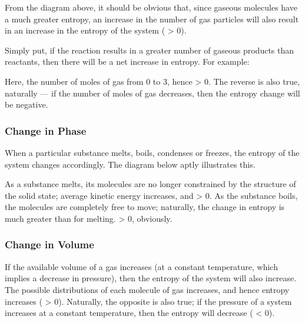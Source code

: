 				From the diagram above, it should be obvious that, since gaseous molecules have a much greater entropy, an increase in the number
				of gas particles will also result in an increase in the entropy of the system (\entr{} > 0).

				Simply put, if the reaction results in a greater number of gaseous products than reactants, then there will be a net
				increase in entropy. For example:


				Here, the number of moles of gas  from 0 to 3, hence \entr{} > 0. The reverse is also true, naturally --- if the
				number of moles of gas decreases, then the entropy change will be negative.


			\pagebreak
			\subsubsection{Change in Phase}

				When a particular substance melts, boils, condenses or freezes, the entropy of the system changes accordingly.
				The diagram below aptly illustrates this.


				As a substance melts, its molecules are no longer constrained by the structure of the solid state; average kinetic energy increases,
				and \entr{} > 0. As the substance boils, the molecules are completely free to move; naturally, the change in entropy is much greater
				than for melting. \entr{} > 0, obviously.


			\subsubsection{Change in Volume}

				If the available volume of a gas increases (at a constant temperature, which implies a decrease in pressure), then the entropy
				of the system will also increase. The possible distributions of each molecule of gas increases, and hence entropy increases
				(\entr{} > 0). Naturally, the opposite is also true; if the pressure of a system increases at a constant temperature, then the entropy
				will decrease (\entr{} < 0).

